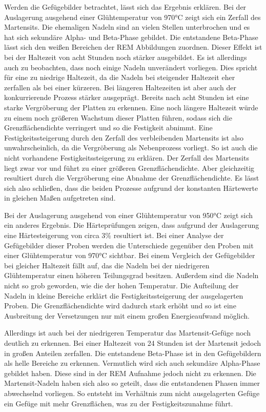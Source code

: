\documentclass[a4paper, 11pt]{tubsreprt}
\begin{document}
Werden die Gefügebilder betrachtet, lässt sich das Ergebnis erklären. Bei der Auslagerung ausgehend einer Glühtemperatur von 970°C zeigt sich ein Zerfall des Martensits. Die ehemaligen Nadeln sind an vielen Stellen unterbrochen und es hat sich sekundäre Alpha- und Beta-Phase gebildet. Die entstandene Beta-Phase lässt sich den weißen Bereichen der REM Abbildungen zuordnen. Dieser Effekt ist bei der Haltezeit von acht Stunden noch stärker ausgebildet. Es ist allerdings auch zu beobachten, dass noch einige Nadeln unverändert vorliegen. Dies spricht für eine zu niedrige Haltezeit, da die Nadeln bei steigender Haltezeit eher zerfallen als bei einer kürzeren. Bei längeren Haltezeiten ist aber auch der konkurrierende Prozess stärker ausgeprägt. Bereits nach acht Stunden ist eine starke Vergröberung der Platten zu erkennen. Eine noch längere Haltezeit würde zu einem noch größeren Wachstum dieser Platten führen, sodass sich die Grenzflächendichte verringert und so die Festigkeit abnimmt. Eine Festigkeitssteigerung durch den Zerfall des verbleibenden Martensits ist also unwahrscheinlich, da die Vergröberung als Nebenprozess vorliegt. So ist auch die nicht vorhandene Festigkeitssteigerung zu erklären. Der Zerfall des Martensits liegt zwar vor und führt zu einer größeren Grenzflächendichte. Aber gleichzeitig resultiert durch die Vergröberung eine Abnahme der Grenzflächendichte. Es lässt sich also schließen, dass die beiden Prozesse aufgrund der konstanten Härtewerte in gleichen Maßen aufgetreten sind. 

Bei der Auslagerung ausgehend von einer Glühtemperatur von 950°C zeigt sich ein anderes Ergebnis. Die Härteprüfungen zeigen, dass aufgrund der Auslagerung eine Härtesteigerung von circa 3\%  resultiert ist. Bei einer  Analyse der Gefügebilder dieser Proben werden die Unterschiede gegenüber den Proben mit einer Glühtemperatur von 970°C sichtbar. Bei einem Vergleich der Gefügebilder bei gleicher Haltezeit fällt auf, das die Nadeln bei der niedrigeren Glühtemperatur einen höheren Teilungsgrad besitzen. Außerdem sind die Nadeln nicht so grob geworden, wie die der hohen Temperatur. Die Aufteilung der Nadeln in kleine Bereiche erklärt die Festigkeitssteigerung der ausgelagerten Proben. Die Grenzflächendichte wird dadurch stark erhöht und so ist eine Ausbreitung der Versetzungen nur mit einem großen Energieaufwand möglich. 

Allerdings ist auch bei der niedrigeren Temperatur das Martensit-Gefüge noch deutlich zu erkennen. Bei einer Haltezeit von 24 Stunden ist der Martensit jedoch in großen Anteilen zerfallen. Die entstandene Beta-Phase ist in den Gefügebildern als helle Bereiche zu erkennen. Vermutlich wird sich auch sekundäre Alpha-Phase gebildet haben. Diese sind in der REM Aufnahme jedoch nicht zu erkennen. Die Martensit-Nadeln haben sich also so geteilt, dass die entstandenen Phasen immer abwechselnd vorliegen. So entsteht im Verhältnis zum nicht ausgelagerten Gefüge ein Gefüge mit mehr Grenzflächen, was zu der Festigkeitszunahme führt.
\end{document}
